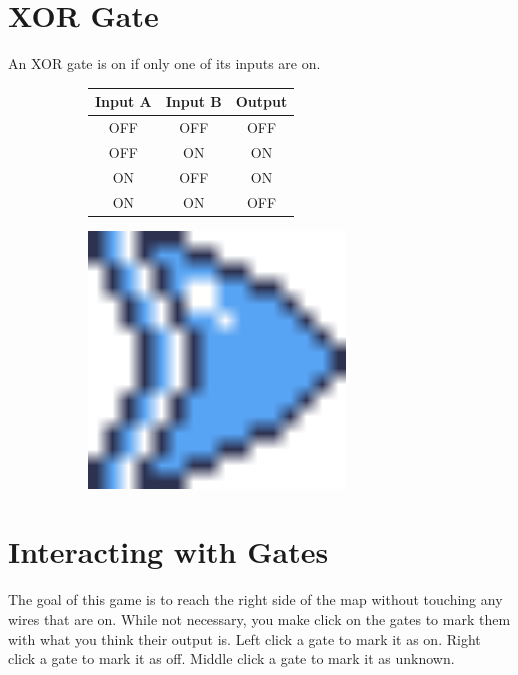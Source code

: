 \documentclass[12pt]{book}
\newcommand{\ON}{\textcolor{on}{ON}}
\newcommand{\OFF}{\textcolor{off}{OFF}}
\begin{document}
		\section{XOR Gate}
			An XOR gate is on if only one of its inputs are on.
			\begin{figure}[h]
				\centering
				\begin{subfigure}{0.75\textwidth}
					\begin{tabular}{|c|c|c|}
						\hline
						\textbf{Input A} & \textbf{Input B} & \textbf{Output}\\\hline
						\OFF & \OFF & \OFF\\\hline
						\OFF & \ON & \ON\\\hline
						\ON & \OFF & \ON\\\hline
						\ON & \ON & \OFF\\\hline
					\end{tabular}
				\end{subfigure}
				\begin{subfigure}{0.2\textwidth}
					\centering
					\includegraphics[width=0.75\textwidth]{XOR}
				\end{subfigure}
			\end{figure}
		\vspace{-20pt}
		\section{Interacting with Gates}
			The goal of this game is to reach the right side of the map without touching any wires that are on. While not necessary, you make click on the gates to mark them with what you think their output is. Left click a gate to mark it as on. Right click a gate to mark it as off. Middle click a gate to mark it as unknown.
\end{document}
